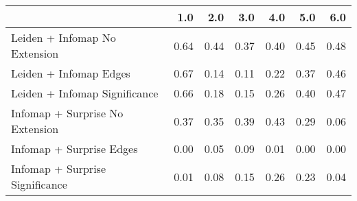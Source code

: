 \begin{tabular}{lrrrrrr}
\toprule
{} &  1.0 &  2.0 &  3.0 &  4.0 &  5.0 &  6.0 \\
\midrule
Leiden + Infomap No Extension   & 0.64 & 0.44 & 0.37 & 0.40 & 0.45 & 0.48 \\
Leiden + Infomap Edges          & 0.67 & 0.14 & 0.11 & 0.22 & 0.37 & 0.46 \\
Leiden + Infomap Significance   & 0.66 & 0.18 & 0.15 & 0.26 & 0.40 & 0.47 \\
Infomap + Surprise No Extension & 0.37 & 0.35 & 0.39 & 0.43 & 0.29 & 0.06 \\
Infomap + Surprise Edges        & 0.00 & 0.05 & 0.09 & 0.01 & 0.00 & 0.00 \\
Infomap + Surprise Significance & 0.01 & 0.08 & 0.15 & 0.26 & 0.23 & 0.04 \\
\bottomrule
\end{tabular}
